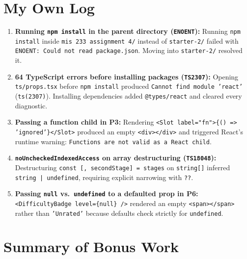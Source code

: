 \documentclass[11pt, a4paper]{article}
\begin{document}
\section{My Own Log}

\begin{enumerate}
  \item \textbf{Running \texttt{npm install} in the parent directory (\texttt{ENOENT}):} Running \texttt{npm install} inside \texttt{mis 233 assignment 4/} instead of \texttt{starter-2/} failed with \texttt{ENOENT: Could not read package.json}. Moving into \texttt{starter-2/} resolved it.
  \item \textbf{64 TypeScript errors before installing packages (\texttt{TS2307}):} Opening \texttt{ts/props.tsx} before \texttt{npm install} produced \texttt{Cannot find module 'react'} (\texttt{ts(2307)}). Installing dependencies added \texttt{@types/react} and cleared every diagnostic.
  \item \textbf{Passing a function child in P3:} Rendering \texttt{<Slot label="fn">\{() => 'ignored'\}</Slot>} produced an empty \texttt{<div></div>} and triggered React's runtime warning: \texttt{Functions are not valid as a React child}.
  \item \textbf{\texttt{noUncheckedIndexedAccess} on array destructuring (\texttt{TS18048}):} Destructuring \texttt{const [, secondStage] = stages} on \texttt{string[]} inferred \texttt{string | undefined}, requiring explicit narrowing with \texttt{??}.
  \item \textbf{Passing \texttt{null} vs.\ \texttt{undefined} to a defaulted prop in P6:} \texttt{<DifficultyBadge level=\{null\} />} rendered an empty \texttt{<span></span>} rather than \texttt{'Unrated'} because defaults check strictly for \texttt{undefined}.
\end{enumerate}

\section{Summary of Bonus Work}
\end{document}

